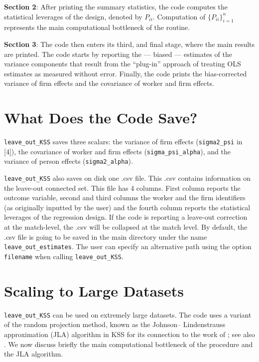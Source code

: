 \documentclass[11pt]{article}
\begin{document}
\textbf{Section 2}: After printing the summary statistics, the code
computes the statistical leverages of the design, denoted by \(P_{ii}\).
Computation of \(\{P_{ii}\}_{i=1}^{n}\) represents the main
computational bottleneck of the routine.

\textbf{Section 3}: The code then enters its third, and final stage,
where the main results are printed. The code starts by reporting the ---
biased --- estimates of the variance components that result from the
``plug-in'' approach of treating OLS estimates as measured without
error. Finally, the code prints the bias-corrected variance of firm
effects and the covariance of worker and firm effects.

    \hypertarget{what-does-the-code-save}{%
\section{What Does the Code Save?}\label{what-does-the-code-save}}

\texttt{leave\_out\_KSS} saves three scalars: the variance of firm
effects (\texttt{sigma2\_psi} in {[}4{]}), the covariance of worker and
firm effects (\texttt{sigma\_psi\_alpha}), and the variance of person
effects (\texttt{sigma2\_alpha}).

\texttt{leave\_out\_KSS} also saves on disk one .csv file. This .csv
contains information on the leave-out connected set. This file has 4
columns. First column reports the outcome variable, second and third
columns the worker and the firm identifiers (as originally inputted by
the user) and the fourth column reports the statistical leverages of the
regression design. If the code is reporting a leave-out correction at the
match-level, the .csv will be collapsed at the match level. By default,
the .csv file is going to be saved in the main directory under the name
\texttt{leave\_out\_estimates}. The user can specify an alternative path
using the option \texttt{filename} when calling
\texttt{leave\_out\_KSS}.

    \hypertarget{scaling-to-large-datasets}{%
\section{Scaling to Large Datasets}\label{scaling-to-large-datasets}}
\label{sec:JLA}
\texttt{leave\_out\_KSS} can be used on extremely large datasets. The
code uses a variant of the random projection method, known as the
Johnson-- Lindenstrauss approximation (JLA) algorithm in KSS
for its connection to the work of \cite{johnson1984extensions}; see
also \cite{achlioptas2001database}. We now discuss briefly the main computational
bottleneck of the procedure and the JLA algorithm.
\end{document}
